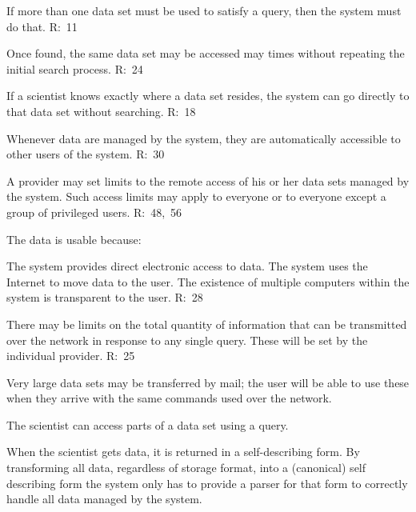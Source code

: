 \begin{list}{}{}
\begin{list}{--}{}
\item If more than one data set must be used to satisfy a query, then the
system must do that. R:~11

\item Once found, the same data set may be accessed may times without
repeating the initial search process. R:~24

\item If a scientist knows exactly where a data set resides, the system can
go directly to that data set without searching. R:~18

\item Whenever data are managed by the system, they are automatically
accessible to other users of the system. R:~30

\item A provider may set limits to the remote access of his or her data sets
managed by the system. Such access limits may apply to everyone or to
everyone except a group of privileged users.  R:~48,~56

\end{list}

\item The data is usable because:
\begin{list}{--}{}

\item The system provides direct electronic access to data. The system
       uses the Internet to move data to the user. The existence of
       multiple computers within the system is transparent to the user.
       R:~28

\begin{list}{--}{}

     \item There may be limits on the total quantity of information
           that can be transmitted over the network in response to
           any single query. These will be set by the individual
           provider.
           R:~25

     \item Very large data sets may be transferred by mail; the user
           will be able to use these when they arrive with the same
           commands used over the network.

     \item The scientist can access parts of a data set using a query.

\end{list}

\item When the scientist gets data, it is returned in a self-describing
      form. By transforming all data, regardless of storage format,
      into a (canonical) self describing form the system only has to
      provide a parser for that form to correctly handle all data
      managed by the system. 


\end{list}
\end{list}
